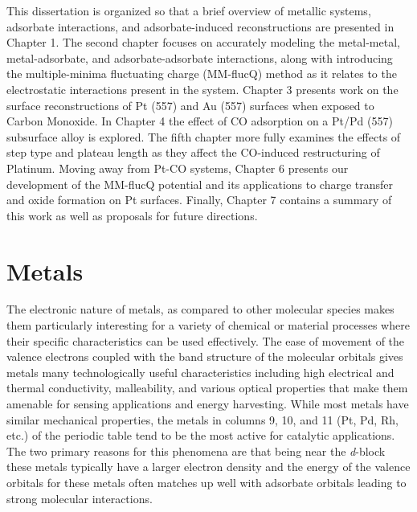 This dissertation is organized so that a brief overview of metallic systems,
adsorbate interactions, and adsorbate-induced reconstructions are presented in
Chapter 1. The second chapter focuses on accurately modeling the metal-metal,
metal-adsorbate, and adsorbate-adsorbate interactions, along with introducing
the multiple-minima fluctuating charge (MM-flucQ) method as it relates to the
electrostatic interactions present in the system. Chapter 3 presents work
on the surface reconstructions of Pt (557) and Au (557) surfaces when exposed
to Carbon Monoxide. In Chapter 4 the effect of CO adsorption on a Pt/Pd (557)
subsurface alloy is explored. The fifth chapter more fully examines the effects
of step type and plateau length as they affect the CO-induced restructuring of
Platinum. Moving away from Pt-CO systems, Chapter 6 presents our development of
the MM-flucQ potential and its applications to charge transfer and oxide
formation on Pt surfaces. Finally, Chapter 7 contains a summary of this
work as well as proposals for future directions.

\section{Metals}
The electronic nature of metals, as compared to other molecular species makes
them particularly interesting for a variety of chemical or material processes
where their specific characteristics can be used effectively. The ease of
movement of the valence electrons coupled with the band structure of the
molecular orbitals gives metals many technologically useful characteristics
including high electrical and thermal conductivity, malleability, and various
optical properties that make them amenable for sensing applications and energy
harvesting. While most metals have similar mechanical properties, the metals in
columns 9, 10, and 11 (Pt, Pd, Rh, etc.) of the periodic table tend to be the
most active for catalytic applications. The two primary reasons for this
phenomena are that being near the {\it d}-block these metals typically have a
larger electron density and the energy of the valence orbitals for these metals
often matches up well with adsorbate orbitals leading to strong molecular
interactions.


